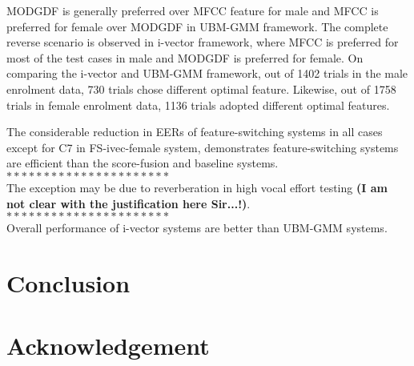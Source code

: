 \documentclass{article}
\begin{document}
\vspace{0.25cm}
MODGDF is generally preferred over MFCC feature for male and MFCC is preferred for female
over MODGDF in UBM-GMM framework. The complete reverse scenario is observed in i-vector
framework, where MFCC is preferred for most of the test cases in male and MODGDF is
preferred for female. On comparing the i-vector and UBM-GMM framework, out of 1402 trials 
in the male enrolment data, 730 trials chose different optimal feature. Likewise, out of
1758 trials in female enrolment data, 1136 trials adopted different optimal features.


The considerable reduction in EERs of feature-switching systems in all cases 
except for C7 in FS-ivec-female system, demonstrates feature-switching systems 
are efficient than the score-fusion and baseline systems. 
\\$**********************$ \\
The exception may be due to reverberation in high vocal effort testing 
\cite{vocalEffort} {\bf (I am not clear with the justification here Sir...!)}. \\ $**********************$ \\ Overall performance of i-vector systems are better 
than UBM-GMM systems.  

\vspace{0.25cm}
\section{Conclusion}
\label{sec:conclude}
\vspace{0.25cm}
\section{Acknowledgement}
\label{sec:ack}


\clearpage 



\end{document}
